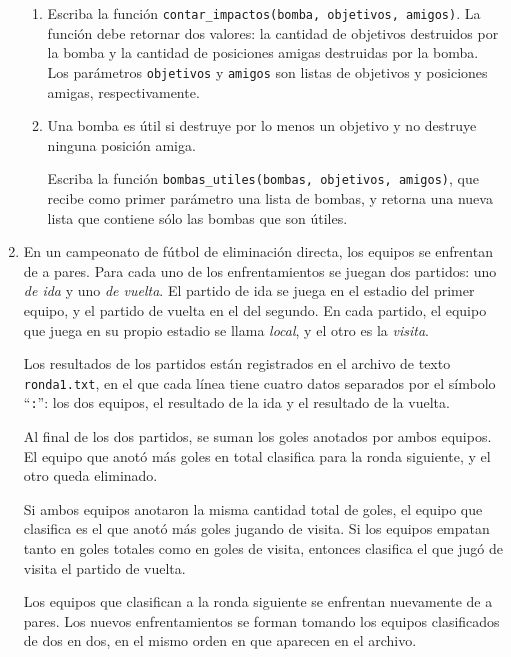 \documentclass[11pt,spanish]{article}
\newcommand{\pond}[1]{[{\small\textbf{#1\%}}]}
\begin{document}
\begin{enumerate}[font=\Large\bfseries]
      \begin{enumerate}
        \item Escriba la función \verb+contar_impactos(bomba, objetivos, amigos)+.
          La función debe retornar dos valores:
          la cantidad de objetivos destruidos por la bomba
          y la cantidad de posiciones amigas destruidas por la bomba.
          Los parámetros \verb+objetivos+ y \verb+amigos+
          son listas de objetivos y posiciones amigas, respectivamente.

        \item
          Una bomba es útil si destruye por lo menos un objetivo
          y no destruye ninguna posición amiga.

          Escriba la función \verb+bombas_utiles(bombas, objetivos, amigos)+,
          que recibe como primer parámetro una lista de bombas,
          y retorna una nueva lista que contiene sólo las bombas que son útiles.
      \end{enumerate}

    \newpage
    \item
      \pond{33\(\frac{1}{3}\)\!}
      En un campeonato de fútbol de eliminación directa, los equipos se enfrentan de a pares.
      Para cada uno de los enfrentamientos se juegan dos partidos:
      uno \emph{de ida} y uno \emph{de vuelta}.
      El partido de ida se juega en el estadio del primer equipo,
      y el partido de vuelta en el del segundo.
      En cada partido, el equipo que juega en su propio estadio se llama \emph{local},
      y el otro es la \emph{visita}.

      Los resultados de los partidos están registrados en el archivo de texto \texttt{ronda1.txt},
      en el que cada línea tiene cuatro datos separados por el símbolo ``\verb+:+'':
      los dos equipos, el resultado de la ida y el resultado de la vuelta.

      Al final de los dos partidos,
      se suman los goles anotados por ambos equipos.
      El equipo que anotó más goles en total clasifica para la ronda siguiente,
      y el otro queda eliminado.

      Si ambos equipos anotaron la misma cantidad total de goles,
      el equipo que clasifica es el que anotó más goles jugando de visita.
      Si los equipos empatan tanto en goles totales como en goles de visita,
      entonces clasifica el que jugó de visita el partido de vuelta.

      Los equipos que clasifican a la ronda siguiente se enfrentan nuevamente de a pares.
      Los nuevos enfrentamientos se forman tomando los equipos clasificados de dos en dos,
      en el mismo orden en que aparecen en el archivo.


\end{enumerate}
\end{document}
